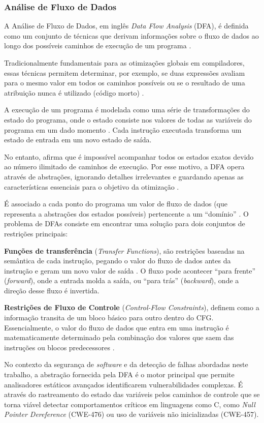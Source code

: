 \documentclass[
    12pt,                %
    openright,           %
    oneside,             %
    a4paper,             %
    english,             %
    brazil               %
]{abntex2}
\begin{document}
\subsubsection{Análise de Fluxo de Dados}
\label{sec:analisefluxo}
\par
A Análise de Fluxo de Dados, em inglês \textit{Data Flow Analysis} (DFA), é definida como um conjunto de técnicas que derivam informações sobre o fluxo de dados ao longo dos possíveis caminhos de execução de um programa \cite{aho2007compilers}.
\par
Tradicionalmente fundamentais para as otimizações globais em compiladores, essas técnicas permitem determinar, por exemplo, se duas expressões avaliam para o mesmo valor em todos os caminhos possíveis ou se o resultado de uma atribuição nunca é utilizado (código morto) \cite{aho2007compilers}.
\par
A execução de um programa é modelada como uma série de transformações do estado do programa, onde o estado consiste nos valores de todas as variáveis do programa em um dado momento \cite{aho2007compilers}.
Cada instrução executada transforma um estado de entrada em um novo estado de saída.
\par
No entanto,  afirma que é impossível acompanhar todos os estados exatos devido ao número ilimitado de caminhos de execução.
Por esse motivo, a DFA opera através de abstrações, ignorando detalhes irrelevantes e guardando apenas as características essenciais para o objetivo da otimização \cite{aho2007compilers}.
\par
É associado a cada ponto do programa um valor de fluxo de dados (que representa a abstrações dos estados possíveis) pertencente a um ``domínio'' \cite{aho2007compilers}.
O problema de DFAs consiste em encontrar uma solução para dois conjuntos de restrições principais:
\par
\textbf{Funções de transferência} (\textit{Transfer Functions}), são restrições baseadas na semântica de cada instrução, pegando o valor do fluxo de dados antes da instrução e geram um novo valor de saída \cite{aho2007compilers}.
O fluxo pode acontecer ``para frente'' (\textit{forward}), onde a entrada molda a saída, ou ``para trás'' (\textit{backward}), onde a direção desse fluxo é invertida.
\par
\textbf{Restrições de Fluxo de Controle} (\textit{Control-Flow Constraints}), definem como a informação transita de um bloco básico para outro dentro do CFG. 
Essencialmente, o valor do fluxo de dados que entra em uma instrução é matematicamente determinado pela combinação dos valores que saem das instruções ou blocos predecessores \cite{aho2007compilers}.
\par
No contexto da segurança de \textit{software} e da detecção de falhas abordadas neste trabalho, a abstração fornecida pela DFA é o motor principal que permite analisadores estáticos avançados identificarem vulnerabilidades complexas.
É através do rastreamento do estado das variáveis pelos caminhos de controle que se torna viável detectar comportamentos críticos em linguagens como C, como \textit{Null Pointer Dereference} (CWE-476) ou uso de variáveis não inicializadas (CWE-457).
\end{document}
